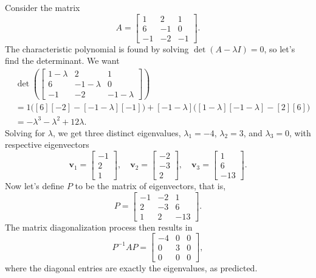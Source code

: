 \documentclass[12pt]{article}
\renewcommand{\vec}[1]{\mathbf{#1}}
\theoremstyle{definition}
\begin{document}
\begin{example}
	Consider the matrix
	\[ A = 
		\begin{bmatrix}
			1 & 2 & 1\\
			6 & -1 & 0\\
			-1 & -2 & -1
		\end{bmatrix}.
	\]
The characteristic polynomial is found by solving $\det(A-\lambda I)=0$, so let's find the determinant. We want
\begin{align*}
			&\det\left(
			\begin{bmatrix}
			1-\lambda & 2 & 1\\
			6 & -1-\lambda & 0\\
			-1 & -2 & -1-\lambda
			\end{bmatrix}
			\right)\\
			&=1 \big( [6][-2] - [-1-\lambda][-1]  \big) + [-1 - \lambda]\big([1 - \lambda][-1 - \lambda] - [2][6]   \big)\\
			&= -\lambda^3 - \lambda^2 + 12 \lambda.
\end{align*}
Solving for $\lambda$, we get three distinct eigenvalues, $\lambda_1=-4$, $\lambda_2=3$, and $\lambda_3=0$, with respective eigenvectors
\[
	\vec{v}_1=\begin{bmatrix} -1 \\ 2 \\ 1 \end{bmatrix}, \quad  \vec{v}_2=\begin{bmatrix} -2 \\ -3 \\ 2 \end{bmatrix}, \quad
	\vec{v}_3=\begin{bmatrix} 1 \\ 6 \\ -13 \end{bmatrix}.
\]
Now let's define $P$ to be the matrix of eigenvectors, that is, 
	\[ P = \begin{bmatrix}
		-1 & -2 & 1 \\ 
		2 & -3 & 6 \\ 
		1 & 2 & -13
		\end{bmatrix}.	\]
The matrix diagonalization process then results in 
	\[P^{-1}AP = \begin{bmatrix}-4 & 0 & 0 \\ 0 & 3 & 0 \\ 0 & 0 & 0  \end{bmatrix},	\]
where the diagonal entries are exactly the eigenvalues, as predicted. 
\end{example}
\end{document}
